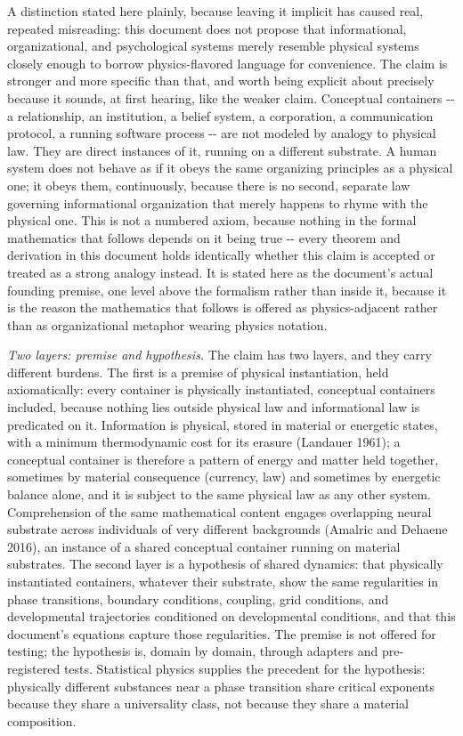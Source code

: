 \documentclass[
]{article}
\begin{document}
A distinction stated here plainly, because leaving it implicit has
caused real, repeated misreading: this document does not propose that
informational, organizational, and psychological systems merely resemble
physical systems closely enough to borrow physics-flavored language for
convenience. The claim is stronger and more specific than that, and
worth being explicit about precisely because it sounds, at first
hearing, like the weaker claim. Conceptual containers -\/- a
relationship, an institution, a belief system, a corporation, a
communication protocol, a running software process -\/- are not modeled
by analogy to physical law. They are direct instances of it, running on
a different substrate. A human system does not behave as if it obeys the
same organizing principles as a physical one; it obeys them,
continuously, because there is no second, separate law governing
informational organization that merely happens to rhyme with the
physical one. This is not a numbered axiom, because nothing in the
formal mathematics that follows depends on it being true -\/- every
theorem and derivation in this document holds identically whether this
claim is accepted or treated as a strong analogy instead. It is stated
here as the document's actual founding premise, one level above the
formalism rather than inside it, because it is the reason the
mathematics that follows is offered as physics-adjacent rather than as
organizational metaphor wearing physics notation.

\emph{Two layers: premise and hypothesis.} The claim has two layers, and
they carry different burdens. The first is a premise of physical
instantiation, held axiomatically: every container is physically
instantiated, conceptual containers included, because nothing lies
outside physical law and informational law is predicated on it.
Information is physical, stored in material or energetic states, with a
minimum thermodynamic cost for its erasure (Landauer 1961); a conceptual
container is therefore a pattern of energy and matter held together,
sometimes by material consequence (currency, law) and sometimes by
energetic balance alone, and it is subject to the same physical law as
any other system. Comprehension of the same mathematical content engages
overlapping neural substrate across individuals of very different
backgrounds (Amalric and Dehaene 2016), an instance of a shared
conceptual container running on material substrates. The second layer is
a hypothesis of shared dynamics: that physically instantiated
containers, whatever their substrate, show the same regularities in
phase transitions, boundary conditions, coupling, grid conditions, and
developmental trajectories conditioned on developmental conditions, and
that this document's equations capture those regularities. The premise
is not offered for testing; the hypothesis is, domain by domain, through
adapters and pre-registered tests. Statistical physics supplies the
precedent for the hypothesis: physically different substances near a
phase transition share critical exponents because they share a
universality class, not because they share a material composition.
\end{document}
